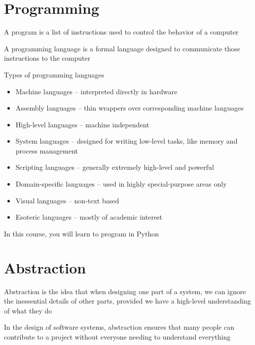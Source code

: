 \documentclass[8pt,a4paper,compress]{beamer}
\begin{document}
\section{Programming}
\begin{frame}[fragile]
\pause

A program is a list of instructions used to control the behavior of a computer

\pause
\bigskip

A programming language is a formal language designed to communicate those instructions to the computer

\pause
\bigskip

Types of programming languages
\begin{itemize}
\item Machine languages -- interpreted directly in hardware
\item Assembly languages -- thin wrappers over corresponding machine languages
\item High-level languages -- machine independent
\item System languages -- designed for writing low-level tasks, like memory and process management
\item Scripting languages -- generally extremely high-level and powerful
\item Domain-specific languages -- used in highly special-purpose areas only
\item Visual languages -- non-text based
\item Esoteric languages -- mostly of academic interest
\end{itemize}

\pause
\bigskip

In this course, you will learn to program in Python
\end{frame}

\section{Abstraction}
\begin{frame}[fragile]
\pause

Abstraction is the idea that when designing one part of a system, we can ignore the inessential details of other parts, provided we have a high-level understanding of what they do

\pause
\bigskip

In the design of software systems, abstraction ensures that many people can contribute to a project without everyone needing to understand everything
\end{frame}
\end{document}
